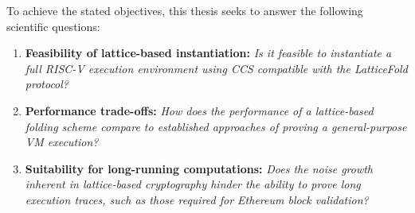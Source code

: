 To achieve the stated objectives, this thesis seeks to answer the following
scientific questions:

\begin{enumerate}
	\item \textbf{Feasibility of lattice-based instantiation:} \textit{Is it
		      feasible to instantiate a full RISC-V execution environment using
		      CCS compatible with the LatticeFold protocol?}
	\item \textbf{Performance trade-offs:} \textit{How does the performance of
		      a lattice-based folding scheme compare to established approaches of proving
		      a general-purpose VM execution?}
	\item \textbf{Suitability for long-running computations:} \textit{Does the
		      noise growth inherent in lattice-based cryptography hinder the ability
		      to prove long execution traces, such as those required for Ethereum block validation?}
\end{enumerate}

